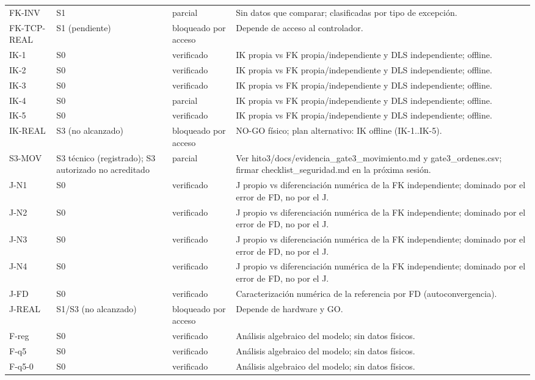 \begin{longtable}{lllp{9cm}}
FK-INV & S1 & parcial & Sin datos que comparar; clasificadas por tipo de excepci\'on. \\
FK-TCP-REAL & S1 (pendiente) & bloqueado por acceso & Depende de acceso al controlador. \\
IK-1 & S0 & verificado & IK propia vs FK propia/independiente y DLS independiente; offline. \\
IK-2 & S0 & verificado & IK propia vs FK propia/independiente y DLS independiente; offline. \\
IK-3 & S0 & verificado & IK propia vs FK propia/independiente y DLS independiente; offline. \\
IK-4 & S0 & parcial & IK propia vs FK propia/independiente y DLS independiente; offline. \\
IK-5 & S0 & verificado & IK propia vs FK propia/independiente y DLS independiente; offline. \\
IK-REAL & S3 (no alcanzado) & bloqueado por acceso & NO-GO f\'isico; plan alternativo: IK offline (IK-1..IK-5). \\
S3-MOV & S3 t\'ecnico (registrado); S3 autorizado no acreditado & parcial & Ver hito3/docs/evidencia\_gate3\_movimiento.md y gate3\_ordenes.csv; firmar checklist\_seguridad.md en la pr\'oxima sesi\'on. \\
J-N1 & S0 & verificado & J propio vs diferenciaci\'on num\'erica de la FK independiente; dominado por el error de FD, no por el J. \\
J-N2 & S0 & verificado & J propio vs diferenciaci\'on num\'erica de la FK independiente; dominado por el error de FD, no por el J. \\
J-N3 & S0 & verificado & J propio vs diferenciaci\'on num\'erica de la FK independiente; dominado por el error de FD, no por el J. \\
J-N4 & S0 & verificado & J propio vs diferenciaci\'on num\'erica de la FK independiente; dominado por el error de FD, no por el J. \\
J-FD & S0 & verificado & Caracterizaci\'on num\'erica de la referencia por FD (autoconvergencia). \\
J-REAL & S1/S3 (no alcanzado) & bloqueado por acceso & Depende de hardware y GO. \\
F-reg & S0 & verificado & An\'alisis algebraico del modelo; sin datos f\'isicos. \\
F-q5 & S0 & verificado & An\'alisis algebraico del modelo; sin datos f\'isicos. \\
F-q5-0 & S0 & verificado & An\'alisis algebraico del modelo; sin datos f\'isicos. \\

\end{longtable}
